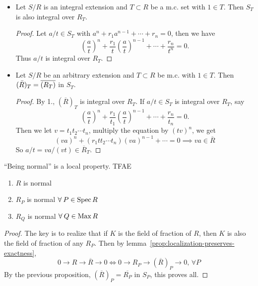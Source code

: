 \begin{prop} \mbox{}
  \begin{itemize}
    \item Let $S/R$ is an integral extension and $T \subset R$ be a m.c. set
      with $1 \in T$. Then $S_T$ is also integral over $R_T$.

    \begin{proof}
      Let $a/t \in S_T$ with $a^n + r_1 a^{n-1} + \dotsb + r_n = 0$,
      then we have
      \[
        \left(\frac{a}{t}\right)^n +
        \frac{r_1}{t}\left(\frac{a}{t}\right)^{n-1} +
        \dotsb + \frac{r_n}{t^n} = 0.
      \]
      Thus $a/t$ is integral over $R_T$.
    \end{proof}
    \item Let $S/R$ be an arbitrary extension and $T \subset R$ be m.c.
      with $1 \in T$. Then $(\bar{R})_T = \overline{(R_T)}$ in $S_T$.

    \begin{proof}
      By 1., $(\overline{R})_T$ is integral over $R_T$.
      If $a/t \in S_T$ is integral over $R_T$, say
      \[
        \left(\frac{a}{t}\right)^n +
        \frac{r_1}{t_1}\left(\frac{a}{t}\right)^{n-1} +
        \dotsb + \frac{r_n}{t_n} = 0.
      \]
      Then we let $v = t_1 t_2 \dotsm t_n$,
      multiply the equation by $(tv)^n$, we get
      \[ (va)^n +
          (r_1 t t_2 \dotsm t_n) (v a)^{n-1} +
          \dotsb = 0 \implies va \in \overline{R} \]
      So $a/t = va / (vt) \in \overline{R}_T$.
    \end{proof}
  \end{itemize}
\end{prop}

\begin{prop}
  ``Being normal'' is a local property. TFAE
  \begin{enumerate}[(1)]
    \item $R$ is normal
    \item $R_P$ is normal $\forall P \in \Spec R$
    \item $R_Q$ is normal $\forall Q \in \Max R$
  \end{enumerate}

  \begin{proof}
    The key is to realize that if $K$ is the field of fraction of $R$,
    then $K$ is also the field of fraction of any $R_P$. Then by
    lemma~\ref{prop:localization-preserves-exactness},
    \[ 0 \to R \to \overline{R} \to 0 \iff 0 \to R_P \to (\overline{R})_P \to 0, \, \forall P \]
    By the previous proposition, $(\overline{R})_P = \overline{R_P}$ in $S_P$, this proves all.
  \end{proof}
\end{prop}

